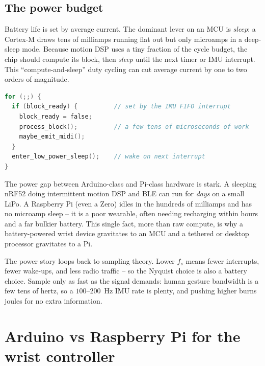 \subsection{The power budget}

Battery life is set by average current. The dominant lever on an MCU is \emph{sleep}: a Cortex-M
draws tens of milliamps running flat out but only microamps in a deep-sleep mode. Because motion
DSP uses a tiny fraction of the cycle budget, the chip should compute its block, then \emph{sleep}
until the next timer or IMU interrupt. This ``compute-and-sleep'' duty cycling can cut average
current by one to two orders of magnitude.

\begin{lstlisting}[language=C, caption={Compute-then-sleep duty cycling (pseudocode).}]
for (;;) {
  if (block_ready) {          // set by the IMU FIFO interrupt
    block_ready = false;
    process_block();          // a few tens of microseconds of work
    maybe_emit_midi();
  }
  enter_low_power_sleep();    // wake on next interrupt
}
\end{lstlisting}

\begin{applicationbox}
The power gap between Arduino-class and Pi-class hardware is stark. A sleeping nRF52 doing
intermittent motion DSP and BLE can run for \emph{days} on a small LiPo. A Raspberry Pi (even a
Zero) idles in the hundreds of milliamps and has no microamp sleep -- it is a poor wearable, often
needing recharging within hours and a far bulkier battery. This single fact, more than raw compute,
is why a battery-powered wrist device gravitates to an MCU and a tethered or desktop processor
gravitates to a Pi.
\end{applicationbox}

\begin{connectionbox}
The power story loops back to sampling theory. Lower $f_s$ means fewer interrupts, fewer wake-ups,
and less radio traffic -- so the Nyquist choice is also a battery choice. Sample only as fast as
the signal demands: human gesture bandwidth is a few tens of hertz, so a $100$--$200$~Hz IMU rate
is plenty, and pushing higher burns joules for no extra information.
\end{connectionbox}

\section{Arduino vs Raspberry Pi for the wrist controller}
\label{ch40:compare}

